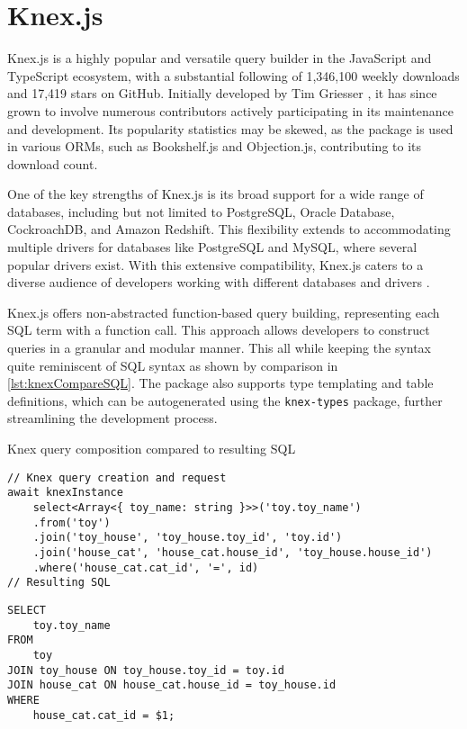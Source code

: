 \section{Knex.js}
Knex.js is a highly popular and versatile query builder in the JavaScript and
TypeScript ecosystem, with a substantial following of 1,346,100 weekly downloads
and 17,419 stars on GitHub. Initially developed by Tim Griesser
\cite{KnexCommits}, it has since grown to involve numerous contributors actively
participating in its maintenance and development. Its popularity statistics may
be skewed, as the package is used in various ORMs, such as Bookshelf.js and
Objection.js, contributing to its download count.

One of the key strengths of Knex.js is its broad support for a wide range of
databases, including but not limited to PostgreSQL, Oracle Database,
CockroachDB, and Amazon Redshift. This flexibility extends to accommodating
multiple drivers for databases like PostgreSQL and MySQL, where several popular
drivers exist. With this extensive compatibility, Knex.js caters to a diverse
audience of developers working with different databases and drivers
\cite{knexDocumentation}.

Knex.js offers non-abstracted function-based query building, representing each
SQL term with a function call. This approach allows developers to construct
queries in a granular and modular manner. This all while keeping the syntax
quite reminiscent of SQL syntax as shown by comparison in
\autoref{lst:knexCompareSQL}. The package also supports type templating and
table definitions, which can be autogenerated using the \texttt{knex-types}
\cite{knexTypes} package, further streamlining the development process.

\begin{listing}
    \caption{Knex query composition compared to resulting SQL}
    \label{lst:knexCompareSQL}
\begin{verbatim}
// Knex query creation and request
await knexInstance
    select<Array<{ toy_name: string }>>('toy.toy_name')
    .from('toy')
    .join('toy_house', 'toy_house.toy_id', 'toy.id')
    .join('house_cat', 'house_cat.house_id', 'toy_house.house_id')
    .where('house_cat.cat_id', '=', id)
// Resulting SQL
\end{verbatim} 

\vspace{-\medskipamount}
\vspace{-1.5\baselineskip}
\vspace{0.8pt}%

\begin{verbatim}
SELECT
    toy.toy_name
FROM
    toy
JOIN toy_house ON toy_house.toy_id = toy.id
JOIN house_cat ON house_cat.house_id = toy_house.id
WHERE
    house_cat.cat_id = $1;
\end{verbatim}    
\end{listing}

